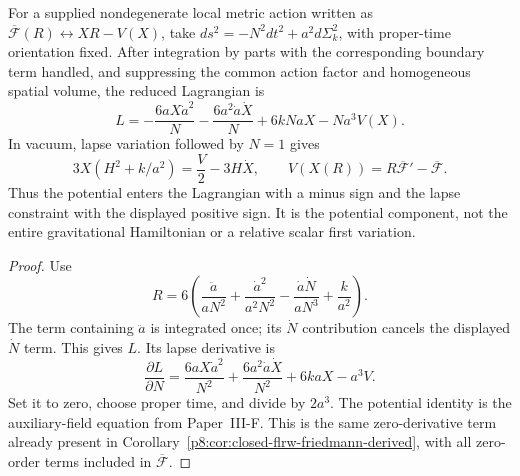 \documentclass[12pt,a4paper]{article}
\begin{document}
\begin{proposition}
\label{p8:prop:bare-legendre-lapse-potential}
For a supplied nondegenerate local metric action written as
\(\overline{\mathcal F}(R)\leftrightarrow XR-V(X)\), take
\(ds^2=-N^2dt^2+a^2d\Sigma_k^2\), with proper-time orientation fixed.
After integration by parts with the corresponding boundary term handled,
and suppressing the common action factor and homogeneous spatial volume,
the reduced Lagrangian is
\[
 L=-\frac{6aX\dot a^2}{N}
   -\frac{6a^2\dot a\dot X}{N}+6kNaX-Na^3V(X).
\]
In vacuum, lapse variation followed by \(N=1\) gives
\begin{equation}
 \label{p8:eq:bare-legendre-lapse-potential}
 \boxed{3X(H^2+k/a^2)=\frac{V}{2}-3H\dot X,\qquad
 V(X(R))=R\overline{\mathcal F}'-\overline{\mathcal F}.}
\end{equation}
Thus the potential enters the Lagrangian with a minus sign and the lapse
constraint with the displayed positive sign. It is the potential component,
not the entire gravitational Hamiltonian or a relative scalar first
variation.
\end{proposition}
\begin{proof}
Use
\[
 R=6\left(\frac{\ddot a}{aN^2}
 +\frac{\dot a^2}{a^2N^2}
 -\frac{\dot a\dot N}{aN^3}+\frac{k}{a^2}\right).
\]
The term containing \(\ddot a\) is integrated once; its \(\dot N\)
contribution cancels the displayed \(\dot N\) term. This gives \(L\).
Its lapse derivative is
\[
 \frac{\partial L}{\partial N}
 =\frac{6aX\dot a^2}{N^2}
  +\frac{6a^2\dot a\dot X}{N^2}+6kaX-a^3V.
\]
Set it to zero, choose proper time, and divide by \(2a^3\).
The potential identity is the auxiliary-field equation from Paper~III-F.
This is the same zero-derivative term already present in
Corollary~\ref{p8:cor:closed-flrw-friedmann-derived}, with all zero-order
terms included in \(\overline{\mathcal F}\).
\end{proof}
\end{document}
